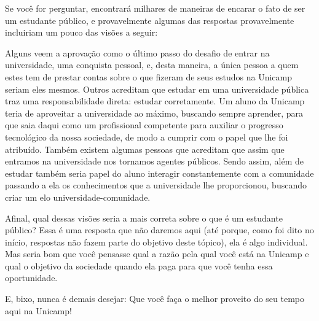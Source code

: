 Se você for perguntar, encontrará milhares de maneiras de encarar o fato de ser
um estudante público, e provavelmente algumas das respostas provavelmente
incluiriam um pouco das visões a seguir:

Alguns veem a aprovação como o último passo do desafio de entrar na
universidade, uma conquista pessoal, e, desta maneira, a única pessoa a quem
estes tem de prestar contas sobre o que fizeram de seus estudos na Unicamp
seriam eles mesmos. Outros acreditam que estudar em uma universidade pública
traz uma responsabilidade direta: estudar corretamente. Um aluno da Unicamp
teria de aproveitar a universidade ao máximo, buscando sempre aprender, para que
saia daqui como um profissional competente para auxiliar o progresso tecnológico
da nossa sociedade, de modo a cumprir com o papel que lhe foi atribuído. Também
existem algumas pessoas que acreditam que assim que entramos na universidade nos
tornamos agentes públicos. Sendo assim, além de estudar também seria papel do
aluno interagir constantemente com a comunidade passando a ela os conhecimentos
que a universidade lhe proporcionou, buscando criar um elo
universidade-comunidade.

Afinal, qual dessas visões seria a mais correta sobre o que é um estudante
público? Essa é uma resposta que não daremos aqui (até porque, como foi dito no
início, respostas não fazem parte do objetivo deste tópico), ela é algo
individual. Mas seria bom que você pensasse qual a razão pela qual você está na
Unicamp e qual o objetivo da sociedade quando ela paga para que você tenha essa
oportunidade.

E, bixo, nunca é demais desejar: Que você faça o melhor proveito do seu tempo
aqui na Unicamp!
